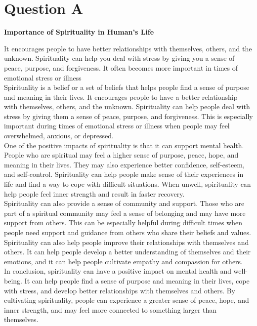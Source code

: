 \documentclass[11pt]{article}
\begin{document}
\tableofcontents
\thispagestyle{empty}
\clearpage

\setcounter{page}{1}

\section{Question A}

\textbf{Importance of Spirituality in Human's Life}

It encourages people to have better relationships with themselves, others, and the unknown. Spirituality can help you deal with stress by giving you a sense of peace, purpose, and forgiveness. It often becomes more important in times of emotional stress or illness\\

Spirituality is a belief or a set of beliefs that helps people find a sense of purpose and meaning in their lives. It encourages people to have a better relationship with themselves, others, and the unknown. Spirituality can help people deal with stress by giving them a sense of peace, purpose, and forgiveness. This is especially important during times of emotional stress or illness when people may feel overwhelmed, anxious, or depressed.\\

One of the positive impacts of spirituality is that it can support mental health. People who are spiritual may feel a higher sense of purpose, peace, hope, and meaning in their lives. They may also experience better confidence, self-esteem, and self-control. Spirituality can help people make sense of their experiences in life and find a way to cope with difficult situations. When unwell, spirituality can help people feel inner strength and result in faster recovery.\\

Spirituality can also provide a sense of community and support. Those who are part of a spiritual community may feel a sense of belonging and may have more support from others. This can be especially helpful during difficult times when people need support and guidance from others who share their beliefs and values. Spirituality can also help people improve their relationships with themselves and others. It can help people develop a better understanding of themselves and their emotions, and it can help people cultivate empathy and compassion for others.\\

In conclusion, spirituality can have a positive impact on mental health and well-being. It can help people find a sense of purpose and meaning in their lives, cope with stress, and develop better relationships with themselves and others. By cultivating spirituality, people can experience a greater sense of peace, hope, and inner strength, and may feel more connected to something larger than themselves.\\
\clearpage
\end{document}
